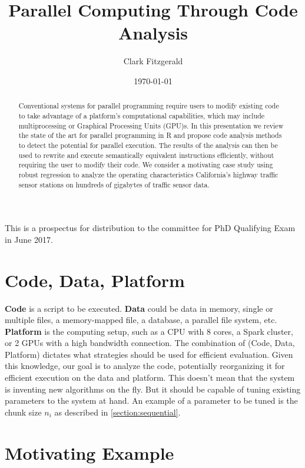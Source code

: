 \documentclass[12pt]{article}
\begin{document}
\title{Parallel Computing Through Code Analysis}
\date{\today}
\author{Clark Fitzgerald}
\maketitle

\begin{abstract}

    Conventional systems for parallel programming require users to modify
    existing code to take advantage of a platform's computational
    capabilities, which may include multiprocessing or Graphical Processing
    Units (GPU)s. In this presentation we review the state of the art for
    parallel programming in R and propose code analysis methods to detect
    the potential for parallel execution. The results of the analysis can
    then be used to rewrite and execute semantically equivalent
    instructions efficiently, without requiring the user to modify their
    code. We consider a motivating case study using robust regression to
    analyze the operating characteristics California's highway traffic
    sensor stations on hundreds of gigabytes of traffic sensor data.

\end{abstract}

This is a prospectus for distribution to the committee for PhD
Qualifying Exam in June 2017.

\section{Code, Data, Platform}

\textbf{Code} is a script to be executed.
\textbf{Data} could be data in memory, single or multiple files, a
memory-mapped file, a database, a parallel file system, etc.
\textbf{Platform} is the computing setup, such as a CPU with 8 cores, a
Spark cluster, or 2 GPUs with a high bandwidth connection. The combination
of (Code, Data, Platform) dictates what strategies should be used for
efficient evaluation. Given this knowledge, our goal is to analyze the
code, potentially reorganizing it for efficient execution on the data and
platform.  This doesn't mean that the system is inventing new algorithms on
the fly.  But it should be capable of tuning existing parameters to the
system at hand. An example of a parameter to be tuned is the chunk size
$n_i$ as described in \ref{section:sequential}.

\section{Motivating Example}
\end{document}

